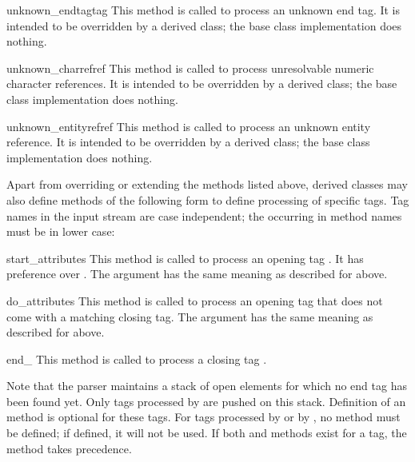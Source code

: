 \begin{funcdesc}{unknown_endtag}{tag}
This method is called to process an unknown end tag.  It is intended
to be overridden by a derived class; the base class implementation
does nothing.
\end{funcdesc}

\begin{funcdesc}{unknown_charref}{ref}
This method is called to process unresolvable numeric character
references.  It is intended to be overridden by a derived class; the
base class implementation does nothing.
\end{funcdesc}

\begin{funcdesc}{unknown_entityref}{ref}
This method is called to process an unknown entity reference.  It is
intended to be overridden by a derived class; the base class
implementation does nothing.
\end{funcdesc}

Apart from overriding or extending the methods listed above, derived
classes may also define methods of the following form to define
processing of specific tags.  Tag names in the input stream are case
independent; the  occurring in method names must be in lower
case:

\begin{funcdesc}{start_}{attributes}
This method is called to process an opening tag .  It has
preference over .  The  argument
has the same meaning as described for  above.
\end{funcdesc}

\begin{funcdesc}{do_}{attributes}
This method is called to process an opening tag  that does
not come with a matching closing tag.  The  argument
has the same meaning as described for  above.
\end{funcdesc}

\begin{funcdesc}{end_}{}
This method is called to process a closing tag .
\end{funcdesc}

Note that the parser maintains a stack of open elements for which no
end tag has been found yet.  Only tags processed by
 are pushed on this stack.  Definition of an
 method is optional for these tags.  For tags
processed by  or by , no
 method must be defined; if defined, it will not
be used.  If both  and 
methods exist for a tag, the  method takes
precedence.
